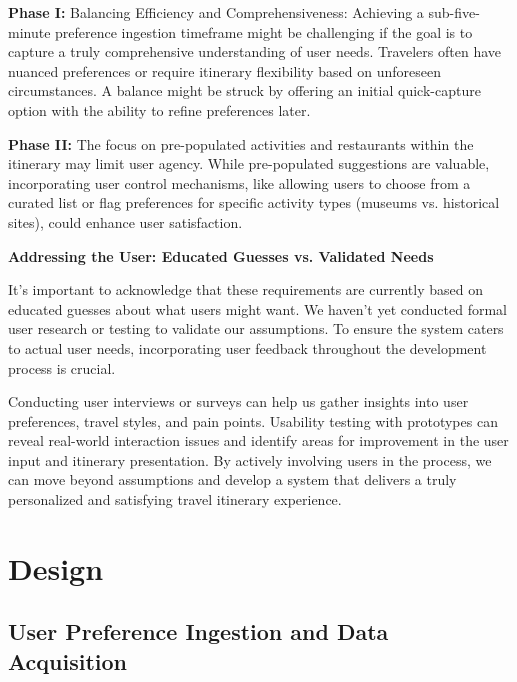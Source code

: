 \documentclass[12pt,a4paper]{report}
\begin{document}
\begin{description}
\item{\textbf{Phase I:} Balancing Efficiency and Comprehensiveness: Achieving a sub-five-minute preference ingestion timeframe might be challenging if the goal is to capture a truly comprehensive understanding of user needs. Travelers often have nuanced preferences or require itinerary flexibility based on unforeseen circumstances. A balance might be struck by offering an initial quick-capture option with the ability to refine preferences later.}

\item{\textbf{Phase II:} The focus on pre-populated activities and restaurants within the itinerary may limit user agency. While pre-populated suggestions are valuable, incorporating user control mechanisms, like allowing users to choose from a curated list or flag preferences for specific activity types (museums vs. historical sites), could enhance user satisfaction.}


\item{\textbf{Addressing the User: Educated Guesses vs. Validated Needs}

It's important to acknowledge that these requirements are currently based on educated guesses about what users might want.  We haven't yet conducted formal user research or testing to validate our assumptions.  To ensure the system caters to actual user needs, incorporating user feedback throughout the development process is crucial.

Conducting user interviews or surveys can help us gather insights into user preferences, travel styles, and pain points.
Usability testing with prototypes can reveal real-world interaction issues and identify areas for improvement in the user input and itinerary presentation. By actively involving users in the process, we can move beyond assumptions and develop a system that delivers a truly personalized and satisfying travel itinerary experience.}
\end{description}



\chapter{Design}

\section{User Preference Ingestion and Data Acquisition}
\end{document}

